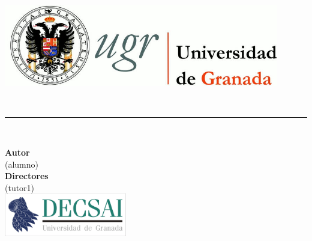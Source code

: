 \begin{titlepage}
 
 
\setlength{\centeroffset}{-0.5\oddsidemargin}
\addtolength{\centeroffset}{0.5\evensidemargin}
\thispagestyle{empty}

\noindent\hspace*{\centeroffset}\begin{minipage}{\textwidth}

\centering
\includegraphics[width=0.9\textwidth]{imagenes/logo_ugr.jpg}

% 

 \vspace{2.5cm}



{\Huge\bfseries \myTitle\\
}
\noindent\rule[-1ex]{\textwidth}{3pt}\\[3.5ex]
\end{minipage}

\vspace{1.5cm}
\noindent\hspace*{\centeroffset}\begin{minipage}{\textwidth}
\centering

\textbf{Autor}\\ {\myName (alumno)}\\[2.5ex]
\textbf{Directores}\\
{\myProf (tutor1)}\\[1.5cm]
\includegraphics[width=0.4\textwidth]{imagenes/decsai}\\[0.1cm]
\textsc{\myDepartment}\\
\end{minipage}

 
\end{titlepage}


